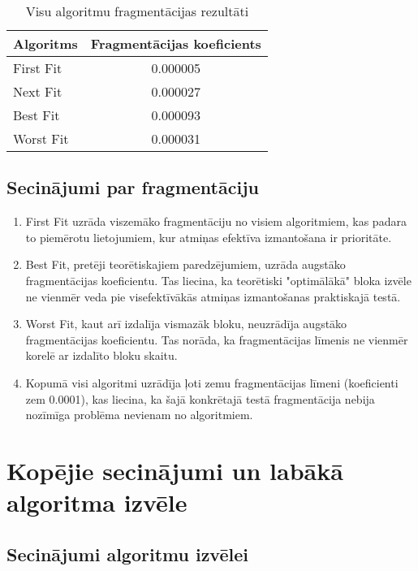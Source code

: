\documentclass{report}
\begin{document}
	\begin{table}[h]
		\centering
		\begin{tabular}{lc}
			\toprule
			\textbf{Algoritms} & \textbf{Fragmentācijas koeficients} \\
			\midrule
			First Fit & 0.000005 \\
			Next Fit & 0.000027 \\
			Best Fit & 0.000093 \\
			Worst Fit & 0.000031 \\
			\bottomrule
		\end{tabular}
		\caption{Visu algoritmu fragmentācijas rezultāti}
		\label{tab:fragmentation}
	\end{table}	

	
	\subsection{Secinājumi par fragmentāciju}
	
	\begin{enumerate}
		\item First Fit uzrāda viszemāko fragmentāciju no visiem algoritmiem, kas padara to piemērotu lietojumiem, kur atmiņas efektīva izmantošana ir prioritāte.
		
		\item Best Fit, pretēji teorētiskajiem paredzējumiem, uzrāda augstāko fragmentācijas koeficientu. Tas liecina, ka teorētiski "optimālākā" bloka izvēle ne vienmēr veda pie visefektīvākās atmiņas izmantošanas praktiskajā testā.
		
		\item Worst Fit, kaut arī izdalīja vismazāk bloku, neuzrādīja augstāko fragmentācijas koeficientu. Tas norāda, ka fragmentācijas līmenis ne vienmēr korelē ar izdalīto bloku skaitu.
		
		\item Kopumā visi algoritmi uzrādīja ļoti zemu fragmentācijas līmeni (koeficienti zem 0.0001), kas liecina, ka šajā konkrētajā testā fragmentācija nebija nozīmīga problēma nevienam no algoritmiem.
	\end{enumerate}
	
	\section{Kopējie secinājumi un labākā algoritma izvēle}
	
	\subsection{Secinājumi algoritmu izvēlei}
	
\end{document}

